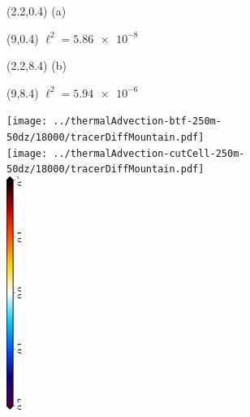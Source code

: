 \documentclass{article}
\begin{document}
\TPMargin{3pt}
\begin{textblock}{0.75}(2.2,0.4)
\normalsize
\centering
(a)
\end{textblock}
\begin{textblock}{2}(9,0.4)
\normalsize
$\ell^2 = \num{5.86e-8}$
\end{textblock}
\begin{textblock}{0.75}(2.2,8.4)
\normalsize
\centering
(b)
\end{textblock}
\begin{textblock}{2}(9,8.4)
\normalsize
$\ell^2 = \num{5.94e-6}$
\end{textblock}
\centering
\texttt{[image: ../thermalAdvection-btf-250m-50dz/18000/tracerDiffMountain.pdf]} \\
\vspace*{0.1in}
\texttt{[image: ../thermalAdvection-cutCell-250m-50dz/18000/tracerDiffMountain.pdf]} \\
\includegraphics[height=3in,angle=270]{tracerDiffMountain_T_diff.eps}
\end{document}
